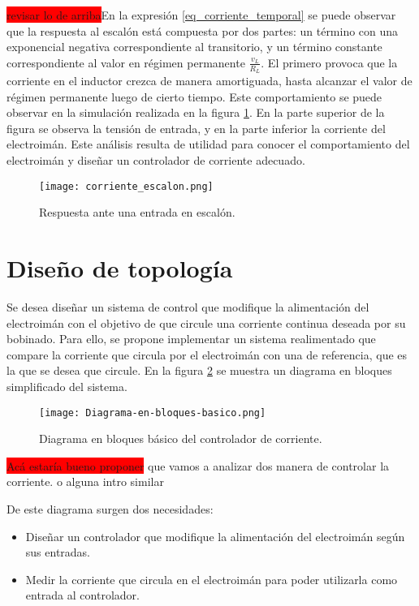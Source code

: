 \colorbox{red}{revisar lo de arriba}En la expresión \ref{eq_corriente_temporal} se puede observar que la respuesta al escalón está compuesta por dos partes: un término con una exponencial negativa correspondiente al transitorio, y un término constante correspondiente al valor en régimen permanente $\frac{v_L}{R_L}$. El primero provoca que la corriente en el inductor crezca de manera amortiguada, hasta alcanzar el valor de régimen permanente luego de cierto tiempo. Este comportamiento se puede observar en la simulación realizada en la figura \ref{fig:img_respuesta_escalon}. En la parte superior de la figura se observa la tensión de entrada, y en la parte inferior la corriente del electroimán. Este análisis resulta de utilidad para conocer el comportamiento del electroimán y diseñar un controlador de corriente adecuado.


\begin{figure}[H]
	\centering
	\texttt{[image: corriente\_escalon.png]}
	\caption{Respuesta ante una entrada en escalón.}
	\label{fig:img_respuesta_escalon}
\end{figure}


\section{Diseño de topología}


Se desea diseñar un sistema de control que modifique la alimentación del electroimán con el objetivo de que circule una corriente continua deseada por su bobinado.  Para ello, se propone implementar un sistema realimentado que compare la corriente que circula por el electroimán con una de referencia, que es la que se desea que circule. En la figura \ref{fig:img_diagrama_bloques_basico} se muestra un diagrama en bloques simplificado del sistema.

\begin{figure}[H]
	\centering
	\texttt{[image: Diagrama-en-bloques-basico.png]}
	\caption{Diagrama en bloques básico del controlador de corriente.}
	\label{fig:img_diagrama_bloques_basico}
\end{figure}

\colorbox{red}{Acá estaría bueno proponer} que vamos a analizar dos manera de controlar la corriente. o alguna intro similar

De este diagrama surgen dos necesidades:
\begin{itemize}
	\item Diseñar un controlador que modifique la alimentación del electroimán según sus entradas.
	\item Medir la corriente que circula en el electroimán para poder utilizarla como entrada al controlador.
\end{itemize}

